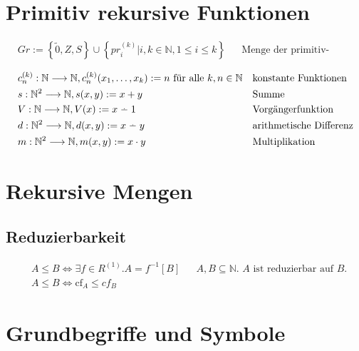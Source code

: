 \documentclass[10pt,oneside,a4paper]{scrartcl}
\newcommand{\dotminus}{\stackrel{\cdot}{\relbar}}
\begin{document}
\section{Primitiv rekursive Funktionen}

    \begin{align}
    &Gr := \left\{\tilde{0}, Z, S\right\} \cup
           \left\{pr_i^{(k)}|i,k\in\mathbb{N}, 1\leq i\leq k\right\}
        && \text{Menge der primitiv-rekursiven Grundfunktionen (PRK)}
    \end{align}

    \begin{align}
    &c_n^{(k)} : \mathbb{N}\longrightarrow \mathbb{N},
        c_n^{(k)}(x_1,\ldots,x_k) := n \text{ für alle }k,n\in\mathbb{N}
        && \text{konstante Funktionen}\\
    &s : \mathbb{N}^2\longrightarrow \mathbb{N}, s(x, y) := x+y
        && \text{Summe}\\
    &V : \mathbb{N}\longrightarrow \mathbb{N}, V(x) := x \dotminus 1
        && \text{Vorgängerfunktion}\\
    &d : \mathbb{N}^2\longrightarrow \mathbb{N}, d(x, y) := x \dotminus y
        && \text{arithmetische Differenz}\\
    &m : \mathbb{N}^2\longrightarrow \mathbb{N}, m(x, y) := x \cdot y
        && \text{Multiplikation}
    \end{align}

\section{Rekursive Mengen}

\subsection{Reduzierbarkeit}

    \begin{align}
    &A \leq B \Longleftrightarrow \exists f \in R^{(1)}.A=f^{-1}[B]
        && \text{$A, B \subseteq\mathbb{N}$. $A$ ist reduzierbar auf $B$.}\\
    &A \leq B \Longleftrightarrow \text{cf}_A\leq cf_B
    \end{align}


\section{Grundbegriffe und Symbole}
\end{document}
